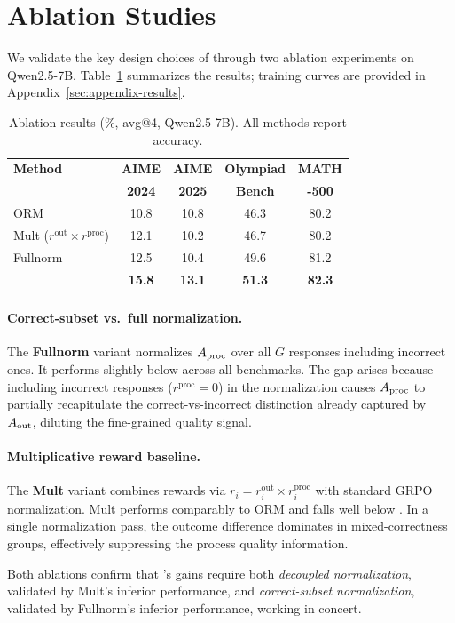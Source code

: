 \section{Ablation Studies}
\label{sec:ablation}

We validate the key design choices of \method{} through two ablation experiments on Qwen2.5-7B. Table~\ref{tab:ablation} summarizes the results; training curves are provided in Appendix~\ref{sec:appendix-results}.

\begin{table}[t]
\centering
\small
\setlength{\tabcolsep}{4pt}
\begin{tabular}{lcccc}
\toprule
\textbf{Method} & \textbf{AIME} & \textbf{AIME} & \textbf{Olympiad} & \textbf{MATH} \\
& \textbf{2024} & \textbf{2025} & \textbf{Bench} & \textbf{-500} \\
\midrule
ORM & 10.8 & 10.8 & 46.3 & 80.2 \\
\midrule
Mult ($r^{\text{out}} \!\times\! r^{\text{proc}}$) & 12.1 & 10.2 & 46.7 & 80.2 \\
Fullnorm & 12.5 & 10.4 & 49.6 & 81.2 \\
\textbf{\method{}} & \textbf{15.8} & \textbf{13.1} & \textbf{51.3} & \textbf{82.3} \\
\bottomrule
\end{tabular}
\caption{Ablation results (\%, avg@4, Qwen2.5-7B). All methods report accuracy.}
\label{tab:ablation}
\end{table}

\paragraph{Correct-subset vs.\ full normalization.}
The \textbf{Fullnorm} variant normalizes $\aproc$ over all $G$ responses including incorrect ones. It performs slightly below \method{} across all benchmarks. The gap arises because including incorrect responses ($r^{\text{proc}} = 0$) in the normalization causes $\aproc$ to partially recapitulate the correct-vs-incorrect distinction already captured by $\aout$, diluting the fine-grained quality signal.

\paragraph{Multiplicative reward baseline.}
The \textbf{Mult} variant combines rewards via $r_i = r_i^{\text{out}} \times r_i^{\text{proc}}$ with standard GRPO normalization. Mult performs comparably to ORM and falls well below \method{}. In a single normalization pass, the outcome difference dominates in mixed-correctness groups, effectively suppressing the process quality information.

Both ablations confirm that \method{}'s gains require both \emph{decoupled normalization}, validated by Mult's inferior performance, and \emph{correct-subset normalization}, validated by Fullnorm's inferior performance, working in concert.
